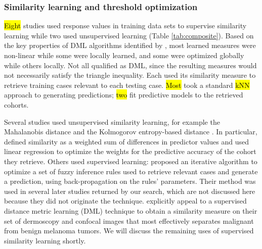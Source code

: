 \documentclass[sn-mathphys,Numbered,pdflatex]{sn-jnl}
\theoremstyle{remark}
\theoremstyle{definition}
\begin{document}
\subsubsection{Similarity learning and threshold
optimization}\label{similarity-learning-and-threshold-optimization}

\hl{Eight} studies used response values in training data sets to
supervise similarity learning while two used unsupervised learning
(Table \ref{tab:composite}). Based on the key properties of DML
algorithms identified by \citet{Bellet2014}, most learned measures were
non-linear while some were locally learned, and some were optimized
globally while others locally. Not all qualified as DML, since the
resulting measures would not necessarily satisfy the triangle
inequality. Each used its similarity measure to retrieve training cases
relevant to each testing case. \hl{Most} took a standard \hl{kNN}
approach to generating predictions; \hl{two}
\citep{Vilhena2016, Tang2021} fit predictive models to the retrieved
cohorts.

Several studies used unsupervised similarity learning, for example the
Mahalanobis distance \citep{Lowsky2013} and the Kolmogorov entropy-based
distance \citep{Elter2007}. In particular, \citet{Yearwood1997} defined
similarity as a weighted sum of differences in predictor values and used
linear regression to optimize the weights for the predictive accuracy of
the cohort they retrieve. Others used supervised learning:
\citet{Song2006} proposed an iterative algorithm to optimize a set of
fuzzy inference rules used to retrieve relevant cases and generate a
prediction, using back-propagation on the rules' parameters. Their
method was used in several later studies returned by our search, which
are not discussed here because they did not originate the technique.
\citet{Nicolas2014} explicitly appeal to a supervised distance metric
learning (DML) technique \citep{Xing2002} to obtain a similarity measure
on their set of dermoscopy and confocal images that most effectively
separates malignant from benign melanoma tumors. We will discuss the
remaining uses of supervised similarity learning shortly.
\end{document}
